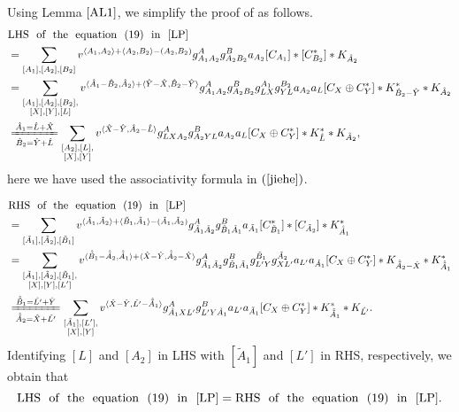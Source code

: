 \documentclass[reqno,12pt]{amsart}
\numberwithin{equation}{section}
\def\lr#1{\langle #1\rangle} \def\fin{\hfill$\square$}  \def\lra{\longrightarrow} \def\Tor{\mbox{\rm Tor}\,}
\theoremstyle{plain} %
\theoremstyle{definition} %
\begin{document}
Using Lemma $\ref{AL1}$, we simplify the proof of \cite[Thm. 4.11]{LP} as follows.
\begin{equation*}\begin{split}
&\mbox{LHS~~of~~the~~equation}~~(19)~~\mbox{in~~\cite{LP}}\\&=
\sum_{[A_1],[A_2],[B_2]}v^{\lr{A_1,A_2}+\lr{A_2,B_2}-(A_2,B_2)}g_{A_1A_2}^Ag_{A_2B_2}^Ba_{A_2}[C_{A_1}]\ast[C_{B_2}^\ast]\ast K_{\hat{A}_2}\\&=
\sum_{\substack{[A_1],[A_2],[B_2],\\
[X],[Y],[L]}}v^{\lr{\hat{A}_1-\hat{B}_2,\hat{A}_2}+\lr{\hat{Y}-\hat{X},\hat{B}_2-\hat{Y}}}
g_{A_1A_2}^Ag_{A_2B_2}^Bg_{LX}^{A_1}g_{YL}^{B_2}a_{A_2}a_{L}[C_X\oplus C_Y^\ast]\ast K_{\hat{B}_2-\hat{Y}}^\ast\ast K_{\hat{A}_2}\\&
\xlongequal[\hat{B}_2=\hat{Y}+\hat{L}]{\hat{A}_1=\hat{L}+\hat{X}}\sum_{\substack{[A_2],[L],\\
[X],[Y]}}v^{\lr{\hat{X}-\hat{Y},\hat{A}_2-\hat{L}}}g_{LXA_2}^Ag_{A_2YL}^Ba_{A_2}a_L[C_X\oplus C_Y^\ast]\ast K_{\hat{L}}^\ast \ast K_{\hat{A}_2},
\end{split}\end{equation*}here we have used the associativity formula in $(\ref{jiehe})$.

\begin{equation*}\begin{split}
&\mbox{RHS~~of~~the~~equation}~~(19)~~\mbox{in~~\cite{LP}}\\&=
\sum_{[\tilde{A}_1],[\tilde{A}_2],[\tilde{B}_1]}v^{\lr{\tilde{A}_1,\tilde{A}_2}+\lr{\tilde{B}_1,\tilde{A}_1}-(\tilde{A}_1,\tilde{A}_2)}g_{\tilde{A}_1\tilde{A}_2}^Ag_{\tilde{B}_1\tilde{A}_1}^Ba_{\tilde{A}_1}[C_{\tilde{B}_1}^\ast]\ast[C_{\tilde{A}_2}]\ast K_{\hat{\tilde{A}}_1}^\ast\\&=
\sum_{\substack{[\tilde{A}_1],[\tilde{A}_2],[\tilde{B}_1],\\
[X],[Y],[L']}}v^{\lr{\hat{\tilde{B}}_1-\hat{\tilde{A}}_2,\hat{\tilde{A}}_1}+\lr{\hat{X}-\hat{Y},\hat{\tilde{A}}_2-\hat{X}}}
g_{\tilde{A}_1\tilde{A}_2}^Ag_{\tilde{B}_1\tilde{A}_1}^Bg_{L'Y}^{\tilde{B}_1}g_{XL'}^{\tilde{A}_2}a_{L'}a_{\tilde{A}_1}[C_X\oplus C_Y^\ast]\ast K_{\hat{\tilde{A}}_2-\hat{X}}\ast K_{\hat{\tilde{A}}_1}^\ast\\&
\xlongequal[\hat{\tilde{A}}_2=\hat{X}+\hat{L'}]{\hat{\tilde{B}}_1=\hat{L'}+\hat{Y}}\sum_{\substack{[\tilde{A}_1],[L'],\\
[X],[Y]}}v^{\lr{\hat{X}-\hat{Y},\hat{L'}-\hat{\tilde{A}}_1}}g_{\tilde{A}_1XL'}^Ag_{L'Y\tilde{A}_1}^Ba_{L'}a_{\tilde{A}_1}[C_X\oplus C_Y^\ast]\ast K_{\hat{\tilde{A}}_1}^\ast \ast K_{\hat{L'}}.
\end{split}\end{equation*}
Identifying $[L]$ and $[A_2]$ in LHS with $[\tilde{A}_1]$ and $[L']$ in RHS, respectively, we obtain that
\begin{equation*}
\mbox{LHS~~of~~the~~equation}~~(19)~~\mbox{in~~\cite{LP}}=\mbox{RHS~~of~~the~~equation}~~(19)~~\mbox{in~~\cite{LP}}.\end{equation*}
\end{document}
